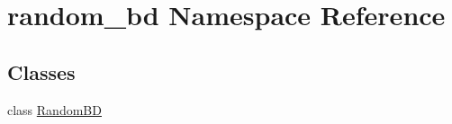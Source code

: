 \hypertarget{namespacerandom__bd}{}\section{random\+\_\+bd Namespace Reference}
\label{namespacerandom__bd}
\subsection*{Classes}
\begin{DoxyCompactItemize}
\item 
class \hyperlink{classrandom__bd_1_1_random_b_d}{Random\+BD}
\end{DoxyCompactItemize}

